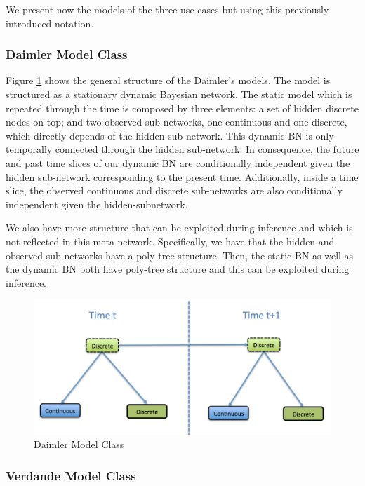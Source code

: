 We present now the models of the three use-cases but using this previously introduced notation. 

\subsubsection*{Daimler Model Class}

Figure \ref{Figure:DaimlerModelClass} shows the general structure of the Daimler's models. The model is structured as a stationary dynamic Bayesian network. The static model which is repeated through the time is composed by three elements: a set of hidden discrete nodes on top; and two observed sub-networks, one continuous and one discrete, which directly depends of the hidden sub-network. This dynamic BN is only temporally connected through the hidden sub-network.  In consequence, the future and past time slices of our dynamic BN are conditionally independent given the hidden sub-network corresponding to the present time. Additionally, inside a time slice, the observed continuous and discrete sub-networks are also conditionally independent given the hidden-subnetwork.

We also have more structure that can be exploited during inference and which is not reflected in this meta-network. Specifically, we have that the hidden and observed sub-networks have a poly-tree structure. Then, the static BN as well as the dynamic BN both have poly-tree structure and this can be exploited during inference. 

\begin{figure}
\begin{center}
\caption{\label{Figure:DaimlerModelClass} Daimler Model Class}
\includegraphics[scale=0.4]{./figures/DaimlerModelClass}
\end{center}
\end{figure}

\subsubsection*{Verdande Model Class}

